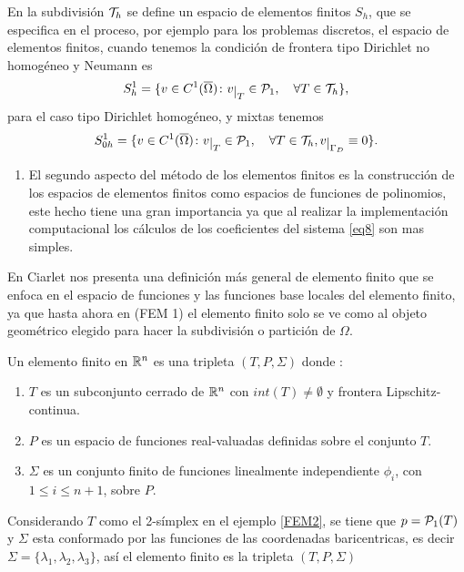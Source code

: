 En la subdivisi\'on ${\mathcal{T}}_{h}$ se define un espacio de elementos finitos $S_{h}$, que se especifica en el proceso, por ejemplo para los problemas discretos, el espacio de elementos finitos, cuando tenemos la condici\'on de frontera tipo Dirichlet no homog\'eneo y Neumann es
\begin{equation}
S_{h}^{1}= \{ v\in C^{1}(\overline{\Omega})\colon  v\restr{T}\in\mcp_{1}, \quad \forall T\in \mct_{h} \},
\end{equation}
para el caso tipo  Dirichlet homog\'eneo, y mixtas tenemos 
\[ S_{0h}^{1}= \{ v\in C^{1}(\overline{\Omega})\colon  v\restr{T}\in \mcp_{1}, \quad \forall T\in \mct_{h}, v\restr{\Gamma_{D}}\equiv 0  \}. \]
\begin{enumerate}[{\rm (FEM 2)}]
\item El segundo aspecto del m\'etodo de los elementos finitos es la construcci\'on de los espacios de elementos finitos como espacios de funciones de polinomios, este hecho tiene una gran importancia ya que al realizar la implementaci\'on computacional los c\'alculos de los coeficientes del sistema \eqref{eq8} son mas simples. 
\end{enumerate}

En Ciarlet \cite[p. 78]{Ciarlet1978} nos presenta una definici\'on m\'as general de elemento finito que se enfoca en el espacio de funciones y las funciones base locales del elemento finito, ya que hasta ahora en (FEM 1) el elemento finito solo se ve como al objeto geom\'etrico elegido para hacer la subdivisi\'on o partici\'on de $\Omega$. 
\begin{definicion}
Un elemento finito en ${\mathbb{R}}^{n}$ es una tripleta $(T,P,\Sigma)$  donde : 
\begin{enumerate}[{\rm (i)}]
	\item $T$ es un subconjunto cerrado de ${\mathbb{R}}^{n}$ con $int(T)\neq \emptyset$ y frontera Lipschitz-continua. 
	\item $P$ es un espacio de funciones real-valuadas definidas sobre el conjunto $T$. 
	\item $\Sigma$ es un conjunto finito de funciones linealmente independiente $\phi_{i}$, con $1\leq i \leq n+1$, sobre $P$. 
\end{enumerate}
\end{definicion}
\begin{ejemplo}
	Considerando  $T$ como el 2-s\'implex en el ejemplo \eqref{FEM2}, se tiene que $p={\mathcal{P}}_{1}(T)$ y $\Sigma$ esta conformado por las funciones de las coordenadas baricentricas, es decir $\Sigma =\{ \lambda_{1},\lambda_{2},\lambda_{3} \}$, as\'i el elemento finito es la tripleta $(T,P,\Sigma)$ 
\end{ejemplo}

